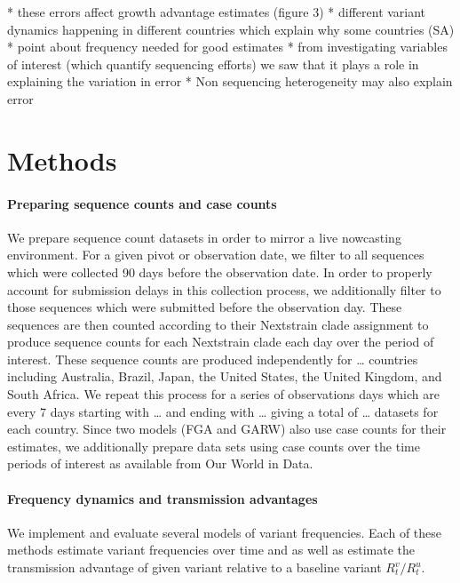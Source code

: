 \documentclass[11pt,oneside,letterpaper]{article}
\begin{document}
* these errors affect growth advantage estimates  (figure 3)
* different variant dynamics happening in different countries which explain why some countries (SA)
* point about frequency needed for good estimates
* from investigating variables of interest (which quantify sequencing efforts) we saw that it plays a role in explaining the variation in error
* Non sequencing heterogeneity may also explain error





\section*{Methods}

\paragraph{Preparing sequence counts and case counts}

We prepare sequence count datasets in order to mirror a live nowcasting environment. 
For a given pivot or observation date, we filter to all sequences which were collected 90 days before the observation date. 
In order to properly account for submission delays in this collection process, we additionally filter to those sequences which were submitted before the observation day.
These sequences are then counted according to their Nextstrain clade assignment to produce sequence counts for each Nextstrain clade each day over the period of interest. 
These sequence counts are produced independently for … countries including Australia, Brazil, Japan, the United States, the United Kingdom, and South Africa.
We repeat this process for a series of observations days which are every 7 days starting with … and ending with … giving a total of … datasets for each country.
Since two models (FGA and GARW) also use case counts for their estimates, we additionally prepare data sets using case counts over the time periods of interest as available from Our World in Data.

\paragraph{Frequency dynamics and transmission advantages}%

We implement and evaluate several models of variant frequencies.
Each of these methods estimate variant frequencies over time and as well as estimate the transmission advantage of given variant relative to a baseline variant $R_{t}^{v} / R_{t}^{u}$.
\end{document}
